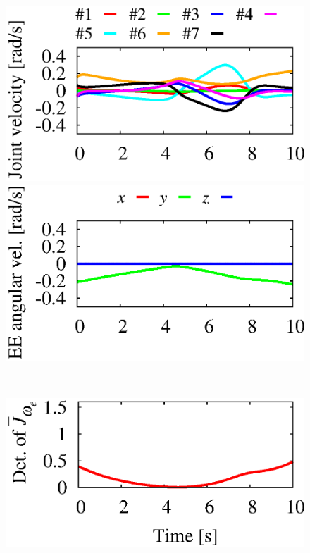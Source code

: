 %
\begin{figure}[t]
  \centering
  \begin{minipage}[h]{0.40\linewidth}
    \centering
    \includegraphics[width=1.0\linewidth]{fig/chapter4/inspection/singularity/SC/U01_joint_velo.eps}
  \end{minipage}
  \begin{minipage}[h]{0.40\linewidth}
    \centering
    \includegraphics[width=1.0\linewidth]{fig/chapter4/inspection/singularity/SC/U08_end_tip_ang_vel.eps}
  \end{minipage}\\
  \vspace{-5mm}
  \begin{minipage}[h]{0.40\linewidth}
    \centering
    \includegraphics[width=1.0\linewidth]{fig/chapter4/inspection/singularity/SC/U16_determinant_Gw.eps}

\end{minipage}
\end{figure}
